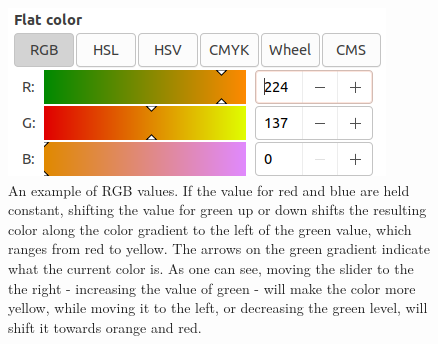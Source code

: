 \begin{figure}[H]
\centering
\includegraphics[width=0.6\linewidth]{figures/rgb-1}
\caption{An example of RGB values.  If the value for red and blue are held constant, shifting the value for green up or down shifts the resulting color along the color gradient to the left of the green value, which ranges from red to yellow.  The arrows on the green gradient indicate what the current color is.  As one can see, moving the slider to the the right - increasing the value of green - will make the color more yellow, while moving it to the left, or decreasing the green level, will shift it towards orange and red.}
\label{fig:rgb-1}
\end{figure}
